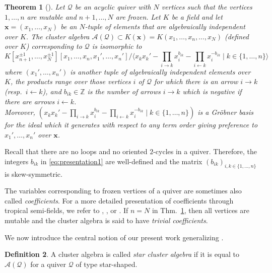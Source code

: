 \documentclass[letter,11pt]{amsart}
\newcommand{\ZZ}{\ensuremath{\mathbb{Z}}}
\newcommand{\cA}{\mathcal{A}}
\newcommand{\cQ}{\mathcal{Q}}
\newcommand{\x}{\boldsymbol{x}}
\theoremstyle{theorem}
\newtheorem{Thm}{Theorem}[section]         %
\theoremstyle{definition}
\newtheorem{defi}[Thm]{Definition} %
\numberwithin{equation}{section}
\begin{document}
\begin{Thm}[{\cite{BFZ2005}}]
	\label{Thm:FirstPresentation}
	Let $ \cQ $ be an acyclic quiver with $ N $ vertices such that the vertices $ 1, \ldots, n $ are mutable 
	and $ n+1, \ldots, N $ are frozen.  
	Let $ K $ be a field
	and let $ \x = (x_1, \ldots, x_N ) $ be an $ N $-tuple of elements that are algebraically independent over $ K $.
	The cluster algebra $ \cA(\cQ) \subset K(\x) =  K(x_1, \ldots, x_n, \ldots, x_N) $ (defined over $ K $) corresponding to $ \cQ $ is isomorphic to
	\begin{equation}
		\label{eq:presentation1} 
		K[x_{n+1}^{\pm 1}, \ldots, x_{N}^{\pm 1}][x_1, \ldots, x_n, x_1', \ldots, x_n']
		/ \langle x_k x_k' - \prod_{i\rightarrow k} x_i^{b_{ik}} - \prod_{i \leftarrow k} x_i^{-b_{ik}} \mid k \in \{ 1, \ldots, n \} \rangle 
	\end{equation}
	where $ (x_1', \ldots, x_n') $ is another tuple of algebraically independent elements over $ K $, 
	the products range over those vertices $ i $ of $ \cQ $ for which there is an arrow $ i \rightarrow k $ (resp.~$ i \leftarrow k $),
	and
	$ b_{ik} \in \ZZ $ is the number of arrows $ i \rightarrow k $ which is negative if there are arrows $ i \leftarrow k $. 
	\\
	Moreover, 
	$ (x_k x_k' - \prod_{i\rightarrow k} x_i^{b_{ik}} - \prod_{i \leftarrow k} x_i^{-b_{ik}} \mid k \in \{ 1, \ldots, n \}) $ 
	is a Gr\"obner basis for the ideal which it generates with respect to any term order
	giving preference to $ x_1', \ldots, x_n' $ over $ \x $.  
\end{Thm}

Recall that there are no loops and no oriented $ 2 $-cycles in a quiver.
Therefore, the integers $ b_{ik} $ in \eqref{eq:presentation1} are well-defined
and the matrix $ (b_{ik})_{i,k \in \{ 1, \ldots, n \} } $ is skew-symmetric.

The variables corresponding to frozen vertices of a quiver are sometimes also called {\em coefficients}.
For a more detailed presentation of coefficients through tropical semi-fields, we refer to \cite[Section~2]{FZ2002}, \cite{FZ2007}, or \cite[Def.~3.1.1]{FWZ2016}.
If $ n = N $ in Thm.~\ref{Thm:FirstPresentation}, 
then all vertices are mutable and the cluster algebra is said to have {\em trivial coefficients}. 

We now introduce the central notion of our present work
generalizing \cite[Sec.~6]{BFMS23}. 

\begin{defi}
	A cluster algebra is called {\em star cluster algebra}
	if it is equal to $ \cA(\cQ) $ 
	for a quiver $ \cQ  $ of type star-shaped.
\end{defi}
\end{document}
